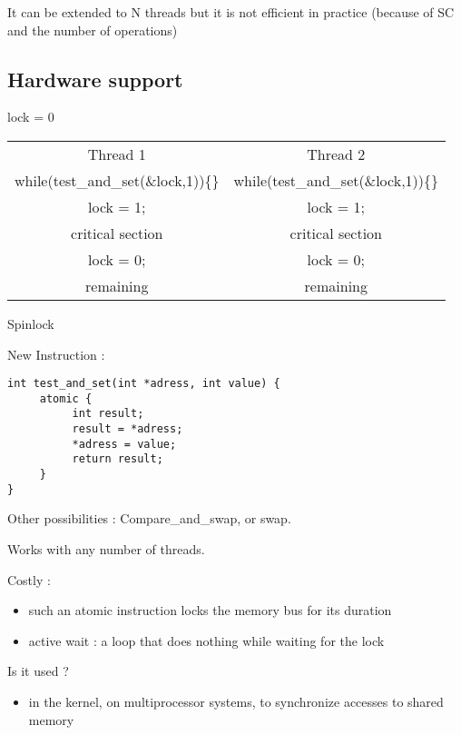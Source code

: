 \documentclass[a4paper,10pt]{article}
\begin{document}
It can be extended to N threads but it is not efficient in practice (because of SC and the number of operations)

\subsection{Hardware support}

\begin{centering}

lock = 0

\begin{tabular}{|cc|}
\hline
	Thread 1 & Thread 2 \\
	while(test\_and\_set(\&lock,1))\{\} & while(test\_and\_set(\&lock,1))\{\}\\
	lock = 1; & lock = 1; \\
	critical section & critical section\\
	lock = 0; & lock = 0; \\
	remaining & remaining\\
\hline
\end{tabular}

Spinlock

\end{centering}

New Instruction :

\begin{verbatim}
int test_and_set(int *adress, int value) {
     atomic {
          int result;
          result = *adress;
          *adress = value;
          return result;
     }
}
\end{verbatim}

Other possibilities : Compare\_and\_swap, or swap.
 
Works with any number of threads.

Costly :

\begin{itemize}
\item such an atomic instruction locks the memory bus for its duration
\item active wait : a loop that does nothing while waiting for the lock
\end{itemize}

Is it used ?
\begin{itemize}
\item in the kernel, on multiprocessor systems, to synchronize accesses to shared memory
\end{itemize}
 
\end{document}
